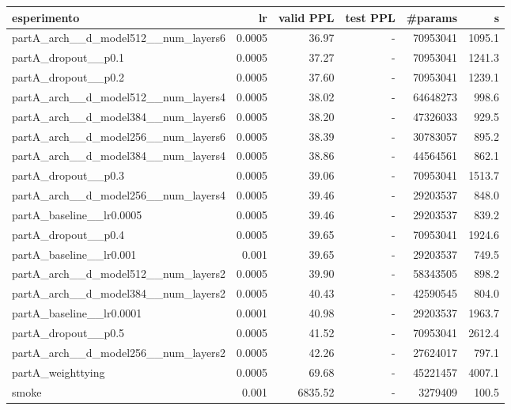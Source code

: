 \begin{tabular}{lrrrrr}
\toprule
esperimento & lr & valid PPL & test PPL & \#params & s \\
\midrule
partA\_arch\_\_d\_model512\_\_num\_layers6 & 0.0005 & 36.97 & - & 70953041 & 1095.1 \\
partA\_dropout\_\_p0.1 & 0.0005 & 37.27 & - & 70953041 & 1241.3 \\
partA\_dropout\_\_p0.2 & 0.0005 & 37.60 & - & 70953041 & 1239.1 \\
partA\_arch\_\_d\_model512\_\_num\_layers4 & 0.0005 & 38.02 & - & 64648273 & 998.6 \\
partA\_arch\_\_d\_model384\_\_num\_layers6 & 0.0005 & 38.20 & - & 47326033 & 929.5 \\
partA\_arch\_\_d\_model256\_\_num\_layers6 & 0.0005 & 38.39 & - & 30783057 & 895.2 \\
partA\_arch\_\_d\_model384\_\_num\_layers4 & 0.0005 & 38.86 & - & 44564561 & 862.1 \\
partA\_dropout\_\_p0.3 & 0.0005 & 39.06 & - & 70953041 & 1513.7 \\
partA\_arch\_\_d\_model256\_\_num\_layers4 & 0.0005 & 39.46 & - & 29203537 & 848.0 \\
partA\_baseline\_\_lr0.0005 & 0.0005 & 39.46 & - & 29203537 & 839.2 \\
partA\_dropout\_\_p0.4 & 0.0005 & 39.65 & - & 70953041 & 1924.6 \\
partA\_baseline\_\_lr0.001 & 0.001 & 39.65 & - & 29203537 & 749.5 \\
partA\_arch\_\_d\_model512\_\_num\_layers2 & 0.0005 & 39.90 & - & 58343505 & 898.2 \\
partA\_arch\_\_d\_model384\_\_num\_layers2 & 0.0005 & 40.43 & - & 42590545 & 804.0 \\
partA\_baseline\_\_lr0.0001 & 0.0001 & 40.98 & - & 29203537 & 1963.7 \\
partA\_dropout\_\_p0.5 & 0.0005 & 41.52 & - & 70953041 & 2612.4 \\
partA\_arch\_\_d\_model256\_\_num\_layers2 & 0.0005 & 42.26 & - & 27624017 & 797.1 \\
partA\_weighttying & 0.0005 & 69.68 & - & 45221457 & 4007.1 \\
smoke & 0.001 & 6835.52 & - & 3279409 & 100.5 \\
\bottomrule
\end{tabular}